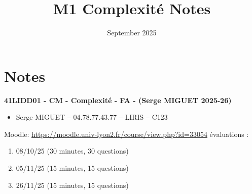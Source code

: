 \documentclass{article}
\title{M1 Complexité Notes}
\date{September 2025}
\begin{document}
\maketitle

\section{Notes}
    \textbf{41LIDD01 - CM - Complexité - FA - (Serge MIGUET 2025-26)}
    \begin{itemize}
        \item Serge MIGUET – 04.78.77.43.77 – LIRIS – C123
    \end{itemize}
    \vspace{2.5mm}
    Moodle: \url{https://moodle.univ-lyon2.fr/course/view.php?id=33054}
    \newline
     évaluations :
    \begin{enumerate}
        \item 08/10/25 (30 minutes, 30 questions)
        \item 05/11/25 (15 minutes, 15 questions)
        \item 26/11/25 (15 minutes, 15 questions) 
    \end{enumerate}
\end{document}
